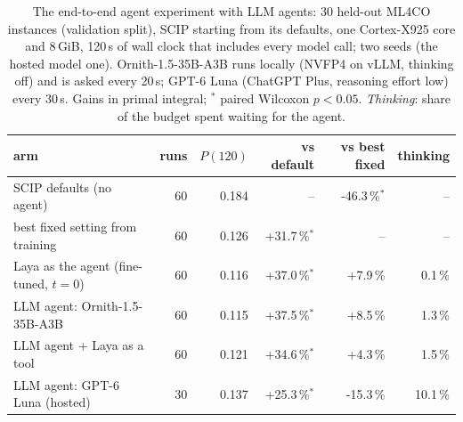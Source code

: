 \begin{table}[t]\centering\small
\begin{tabular}{lrrrrr}
\toprule
arm & runs & $P(120)$ & vs default & vs best fixed & thinking \\
\midrule
SCIP defaults (no agent) & 60 & 0.184 & -- & -46.3\,\%$^{*}$ & -- \\
best fixed setting from training & 60 & 0.126 & +31.7\,\%$^{*}$ & -- & -- \\
Laya as the agent (fine-tuned, $t=0$) & 60 & 0.116 & +37.0\,\%$^{*}$ & +7.9\,\% & 0.1\,\% \\
LLM agent: Ornith-1.5-35B-A3B & 60 & 0.115 & +37.5\,\%$^{*}$ & +8.5\,\% & 1.3\,\% \\
LLM agent + Laya as a tool & 60 & 0.121 & +34.6\,\%$^{*}$ & +4.3\,\% & 1.5\,\% \\
LLM agent: GPT-6 Luna (hosted) & 30 & 0.137 & +25.3\,\%$^{*}$ & -15.3\,\% & 10.1\,\% \\
\bottomrule
\end{tabular}
\caption{The end-to-end agent experiment with LLM agents: 30 held-out ML4CO instances (validation split), SCIP starting from its defaults, one Cortex-X925 core and 8\,GiB, 120\,s of wall clock that includes every model call; two seeds (the hosted model one). Ornith-1.5-35B-A3B runs locally (NVFP4 on vLLM, thinking off) and is asked every 20\,s; GPT-6 Luna (ChatGPT Plus, reasoning effort low) every 30\,s. Gains in primal integral; $^{*}$ paired Wilcoxon $p<0.05$. \emph{Thinking}: share of the budget spent waiting for the agent.}\label{tab:llm}
\end{table}